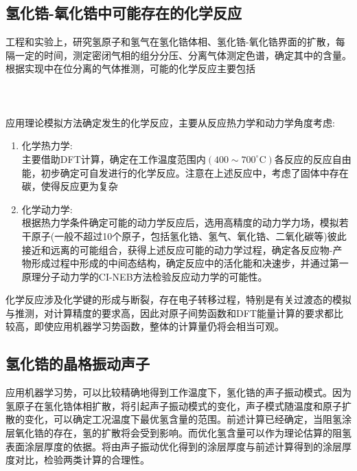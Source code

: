 \subsection{氢化锆-氧化锆中可能存在的化学反应}
工程和实验上，研究氢原子和氢气在氢化锆体相、氢化锆-氧化锆界面的扩散，每隔一定的时间，测定密闭气相的组分分压、分离气体测定色谱，确定其中的含量。根据实现中在位分离的气体推测，可能的化学反应主要包括
{\centering
{}\\
 \\
 \\
\\
}
应用理论模拟方法确定发生的化学反应，主要从反应热力学和动力学角度考虑:
\begin{enumerate}
	\item 化学热力学:\\
		主要借助\textrm{DFT}计算，确定在工作温度范围内$(400\sim700^{\circ}\mathrm{C})$各反应的反应自由能，初步确定可自发进行的化学反应。注意在上述反应中，考虑了固体中存在碳，使得反应更为复杂
	\item 化学动力学:\\
		根据热力学条件确定可能的动力学反应后，选用高精度的动力学力场，模拟若干原子(一般不超过10个原子，包括氢化锆、氢气、氧化锆、二氧化碳等)彼此接近和远离的可能组合，获得上述反应可能的动力学过程，确定各反应物-产物形成过程中形成的中间态结构，确定反应中的活化能和决速步，并通过第一原理分子动力学的\textrm{CI-NEB}方法检验反应动力学的可能性。
\end{enumerate}
化学反应涉及化学键的形成与断裂，存在电子转移过程，特别是有关过渡态的模拟与推测，对计算精度的要求高，因此对原子间势函数和\textrm{DFT}能量计算的要求都比较高，即使应用机器学习势函数，整体的计算量仍将会相当可观。

\subsection{氢化锆的晶格振动声子}
应用机器学习势，可以比较精确地得到工作温度下，氢化锆的声子振动模式。因为氢原子在氢化锆体相扩散，将引起声子振动模式的变化，声子模式随温度和原子扩散的变化，可以确定工况温度下最优氢含量的范围。前述计算已经确定，当阻氢涂层氧化锆的存在，氢的扩散将会受到影响。而优化氢含量可以作为理论估算的阻氢表面涂层厚度的依据。将由声子振动优化得到的涂层厚度与前述计算得到的涂层厚度对比，检验两类计算的合理性。

